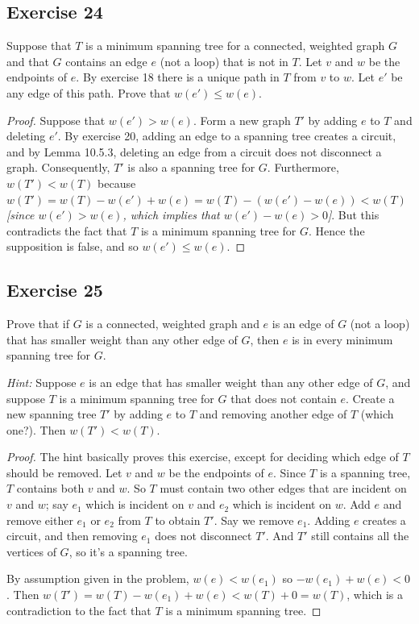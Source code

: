 \documentclass[14pt]{extarticle}
\begin{document}
\subsection{Exercise 24}
Suppose that \(T\) is a minimum spanning tree for a connected, weighted graph \(G\) and that \(G\) contains an edge \(e\) 
(not a loop) that is not in \(T\). Let \(v\) and \(w\) be the endpoints of \(e\). By exercise 18 there is a unique path in 
\(T\) from \(v\) to \(w\). Let \(e'\) be any edge of this path. Prove that \(w(e') \leq w(e)\).

\begin{proof}
Suppose that \(w(e') > w(e)\). Form a new graph \(T'\) by adding \(e\) to \(T\) and deleting \(e'\). By exercise 20, 
adding an edge to a spanning tree creates a circuit, and by Lemma 10.5.3, deleting an edge from a circuit does not 
disconnect a graph. Consequently, \(T'\) is also a spanning tree for \(G\). Furthermore, \(w(T') < w(T)\) because \(w(T') 
= w(T) - w(e') + w(e) = w(T) - (w(e') - w(e)) < w(T)\) {\it [since \(w(e') > w(e)\), which implies that \(w(e') - w(e) > 
0\)]}. But this contradicts the fact that \(T\) is a minimum spanning tree for \(G\). Hence the supposition is false, and 
so \(w(e') \leq w(e)\).
\end{proof}

\subsection{Exercise 25}
Prove that if \(G\) is a connected, weighted graph and \(e\) is an edge of \(G\) (not a loop) that has smaller weight than 
any other edge of \(G\), then \(e\) is in every minimum spanning tree for \(G\).

{\it Hint:} Suppose \(e\) is an edge that has smaller weight than any other edge of \(G\), and suppose \(T\) is a minimum 
spanning tree for \(G\) that does not contain \(e\). Create a new spanning tree \(T'\) by adding \(e\) to \(T\) and removing 
another edge of \(T\) (which one?). Then \(w(T') < w(T)\).

\begin{proof}
The hint basically proves this exercise, except for deciding which edge of \(T\) should be removed. Let \(v\) and \(w\) be
the endpoints of \(e\). Since \(T\) is a spanning tree, \(T\) contains both \(v\) and \(w\). So \(T\) must contain two other 
edges that are incident on \(v\) and \(w\); say \(e_1\) which is incident on \(v\) and \(e_2\) which is incident on \(w\).
Add \(e\) and remove either \(e_1\) or \(e_2\) from \(T\) to obtain \(T'\). Say we remove \(e_1\). Adding \(e\) creates a
circuit, and then removing \(e_1\) does not disconnect \(T'\). And \(T'\) still contains all the vertices of \(G\), so it's a
spanning tree.

By assumption given in the problem, \(w(e) < w(e_1)\) so \(-w(e_1) + w(e) < 0\). Then \(w(T') = w(T) - w(e_1) + w(e) < 
w(T) + 0 = w(T)\), which is a contradiction to the fact that \(T\) is a minimum spanning tree.
\end{proof}
\end{document}
